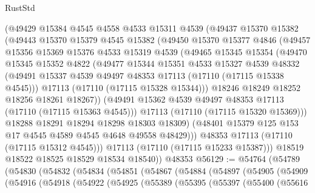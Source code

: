\begin{lexlean}{RustStd}
\begin{coremodule}
          (@49429
            @15384
            @4545
            @4558
            @4533
            @15311
            @4539
            (@49437
              @15370
              @15382
              (@49443
                @15370
                @15379
                @4545
                @15382
                (@49450
                  @15370
                  @15377
                  @4846
                  (@49457
                    @15356
                    @15369
                    @15376
                    @4533
                    @15319
                    @4539
                    (@49465
                      @15345
                      @15354
                      (@49470
                        @15345
                        @15352
                        @4822
                        (@49477
                          @15344
                          @15351
                          @4533
                          @15327
                          @4539
                          @48332
                          (@49491 @15337 @4539 @49497 @48353 @17113 (@17110 (@17115 @15338 @4545)))
                          @17113
                          (@17110 (@17115 @15328 @15344)))
                        @18246
                        @18249
                        @18252
                        @18256
                        @18261
                        @18267))
                    (@49491 @15362 @4539 @49497 @48353 @17113 (@17110 (@17115 @15363 @4545)))
                    @17113
                    (@17110 (@17115 @15320 @15369)))
                  @18288
                  @18291
                  @18294
                  @18298
                  @18303
                  @18309)
                (@48401 @15379 @125 @153 @17 @4545 @4589 @4545 @4648 @49558 @48429)))
            @48353
            @17113
            (@17110 (@17115 @15312 @4545)))
          @17113
          (@17110 (@17115 @15233 @15387)))
        @18519
        @18522
        @18525
        @18529
        @18534
        @18540))
    @48353
@56129 := @54764
    (@54789
      (@54830
        (@54832
          (@54834
            (@54851
              (@54867
                (@54884
                  (@54897
                    (@54905
                      (@54909
                        (@54916
                          (@54918
                            (@54922
                              (@54925
                                (@55389
                                  (@55395
                                    (@55397
                                      (@55400
                                        (@55616

\end{coremodule}
\end{lexlean}
